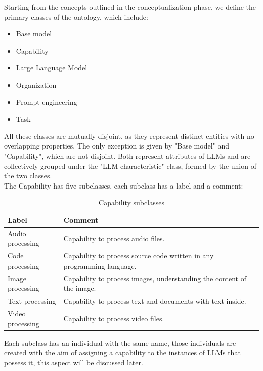 Starting from the concepts outlined in the conceptualization phase, we define the primary classes of the ontology, which include:
\begin{itemize}
    \item Base model

    \item Capability

    \item Large Language Model

    \item Organization

    \item Prompt engineering

    \item Task
\end{itemize}
All these classes are mutually disjoint, as they represent distinct entities with no overlapping properties.
The only exception is given by "Base model" and "Capability", which are not disjoint.
Both represent attributes of LLMs and are collectively grouped under the "LLM characteristic" class, formed by the union of the two classes. \\
The Capability has five subclasses, each subclass has a label and a comment:
\begin{table}[H]
    \footnotesize 
    \centering
    \begin{tabular}{|>{\raggedright\arraybackslash}p{6cm}|>{\raggedright\arraybackslash}p{6cm}|}
        \hline
        Label & Comment \\ \hline
         Audio processing &  Capability to process audio files. \\ \hline
         
         Code processing & Capability to process source code written in any programming language. \\ \hline
         
         Image processing & Capability to process images, understanding the content of the image. \\ \hline
         
         Text processing & Capability to process text and documents with text inside. \\ \hline
         
         Video processing & Capability to process video files. \\ \hline
    \end{tabular}
    \caption{Capability subclasses}
\end{table}
Each subclass has an individual with the same name, those individuals are created with the aim of assigning a capability to the instances of LLMs that possess it, this aspect will be discussed later.

